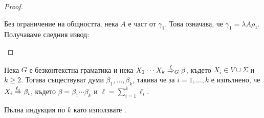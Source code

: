 \begin{proof}
\begin{itemize}
  Без ограничение на общността, нека $A$ е част от $\gamma_1$. Това означава, че
  $\gamma_1 = \lambda A \rho_1$. Получаваме следния извод:
  \begin{prooftree}
  \end{prooftree}
  
  
\end{itemize}
\end{proof}

\begin{proposition}\label{pr:grammar:divide}
  Нека $G$ е безконтекстна граматика и нека $X_1\cdots X_k \derive{\ell}_G \beta$, където $X_i \in V \cup \Sigma$ и $k \geq 2$.
  Тогава съществуват думи $\beta_1,\dots,\beta_k$, такива че за $i = 1,\dots, k$ е изпълнено, че
  $X_i \derive{\ell_i} \beta_i$, където $\beta = \beta_1\cdots \beta_k$ и $\ell = \sum^k_{i = 1}\ell_i$.
\end{proposition}
\begin{hint}
  Пълна индукция по $k$ като използвате .
\end{hint}

